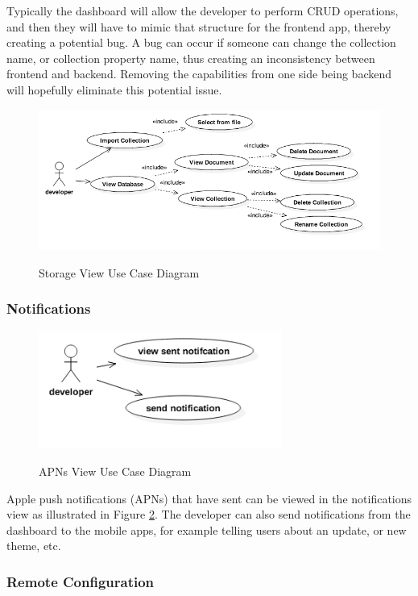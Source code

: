 Typically the dashboard will allow the developer to perform CRUD operations, and then they will have to mimic that structure for the frontend app, thereby creating a potential bug. A bug can occur if someone can change the collection name, or collection property name, thus creating an inconsistency between frontend and backend. Removing the capabilities from one side being backend will hopefully eliminate this potential issue.

\begin{figure}[!h]
    \caption{Storage View Use Case Diagram}
    \centering
    \includegraphics[width=120mm]{images/use_cases/storage_use_case}
    \label{fig:storage_use_case}
\end{figure}

\subsubsection{Notifications} \label{d-db:notifications}

\begin{figure}[!h] 
    \caption{APNs View Use Case Diagram}
    \centering
    \includegraphics[width=80mm]{images/use_cases/notifications_uc}
    \label{fig:notifications_uc}
\end{figure}

Apple push notifications (APNs) that have sent can be viewed in the notifications view as illustrated in Figure \ref{fig:notifications_uc}. The developer can also send notifications from the dashboard to the mobile apps, for example telling users about an update, or new theme, etc. 

\subsubsection{Remote Configuration} \label{d-db:remote_config}

